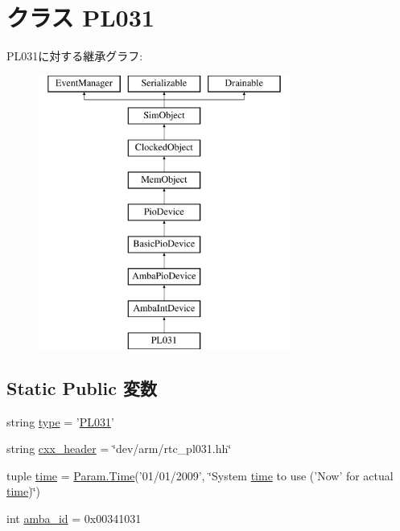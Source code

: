 \hypertarget{classRealView_1_1PL031}{
\section{クラス PL031}
\label{classRealView_1_1PL031}
}
PL031に対する継承グラフ:\begin{figure}[H]
\begin{center}
\leavevmode
\includegraphics[height=9cm]{classRealView_1_1PL031}
\end{center}
\end{figure}
\subsection*{Static Public 変数}
\begin{DoxyCompactItemize}
\item 
string \hyperlink{classRealView_1_1PL031_acce15679d830831b0bbe8ebc2a60b2ca}{type} = '\hyperlink{classRealView_1_1PL031}{PL031}'
\item 
string \hyperlink{classRealView_1_1PL031_a17da7064bc5c518791f0c891eff05fda}{cxx\_\-header} = \char`\"{}dev/arm/rtc\_\-pl031.hh\char`\"{}
\item 
tuple \hyperlink{classRealView_1_1PL031_a429c35172fbcb8b1788bead147e4719b}{time} = \hyperlink{TypeDefines_8hh_ade1c8a9958f9e5394c2e78269e654872}{Param.Time}('01/01/2009', \char`\"{}System \hyperlink{classRealView_1_1PL031_a429c35172fbcb8b1788bead147e4719b}{time} to use ('Now' for actual \hyperlink{classRealView_1_1PL031_a429c35172fbcb8b1788bead147e4719b}{time})\char`\"{})
\item 
int \hyperlink{classRealView_1_1PL031_a38d7b9edfe6f0eea7a54e7e4f6253f3a}{amba\_\-id} = 0x00341031
\end{DoxyCompactItemize}


